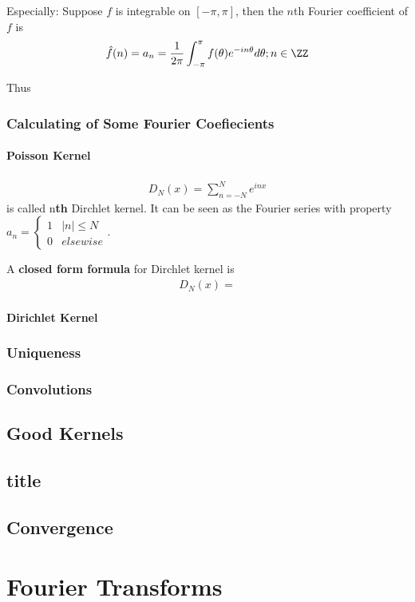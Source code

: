 \documentclass[Total.tex]{subfiles}
\begin{document}
	Especially: Suppose $f$ is integrable on $[-\pi,\pi]$, then the $n$th Fourier coefficient of $f$ is
	\begin{gather*}
		\hat{f}(n)=a_n=\frac{1}{2\pi}\int_{-\pi}^{\pi} f(\theta)e^{-in\theta} d\theta;n\in \ZZ
	\end{gather*}
	
	Thus
	\subsection{Calculating of Some Fourier Coefiecients}
	\subsubsection{Poisson Kernel}
	\begin{gather*}
		D_N(x)=\sum_{n=-N}^N e^{inx}
	\end{gather*}
	is called n\textbf{th} Dirchlet kernel. It can be seen as the Fourier series with property $a_n=\begin{cases}
		1&|n|\leq N\\
		0&elsewise
	\end{cases}$. 
	
	A \textbf{closed form formula} for Dirchlet kernel is
	\begin{gather*}
		D_N(x)=
	\end{gather*}
	\subsubsection{Dirichlet Kernel}
	\subsection{Uniqueness}
	\subsection{Convolutions}
	\section{Good Kernels}
	\section{title}
	\section{Convergence}
	\chapter{Fourier Transforms}
\end{document}

